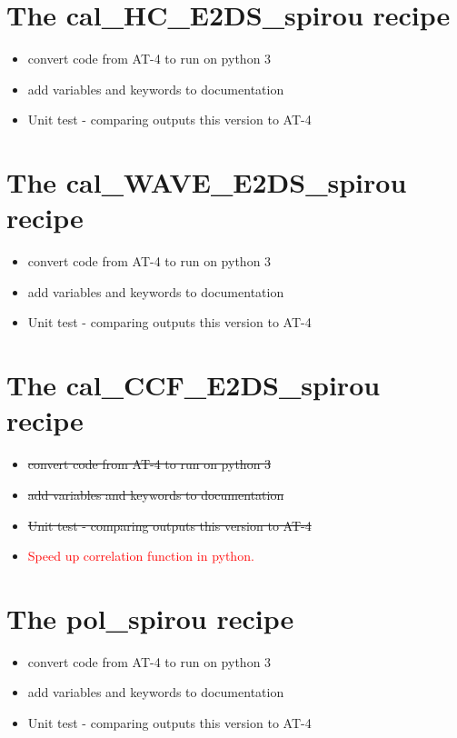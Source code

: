 \section{The cal\_HC\_E2DS\_spirou recipe}
\label{ch:todo:cal_HC_E2DS_spirou}

\begin{itemize}
	\item convert code from AT-4 to run on python 3
	\item add variables and keywords to documentation
	\item Unit test - comparing outputs this version to AT-4
\end{itemize}


\section{The cal\_WAVE\_E2DS\_spirou recipe}
\label{ch:todo:cal_WAVE_E2DS_spirou}

\begin{itemize}
	\item convert code from AT-4 to run on python 3
	\item add variables and keywords to documentation
	\item Unit test - comparing outputs this version to AT-4
\end{itemize}


\section{The cal\_CCF\_E2DS\_spirou recipe}
\label{ch:todo:cal_CCF_E2DS_spirou}

\begin{itemize}
	\item \sout{convert code from AT-4 to run on python 3}
	\item \sout{add variables and keywords to documentation}
	\item \sout{Unit test - comparing outputs this version to AT-4}
	\item \textcolor{red}{Speed up correlation function in python.}
\end{itemize}


\section{The pol\_spirou recipe}
\label{ch:todo:pol_spirou}

\begin{itemize}
	\item convert code from AT-4 to run on python 3
	\item add variables and keywords to documentation
	\item Unit test - comparing outputs this version to AT-4
\end{itemize}
